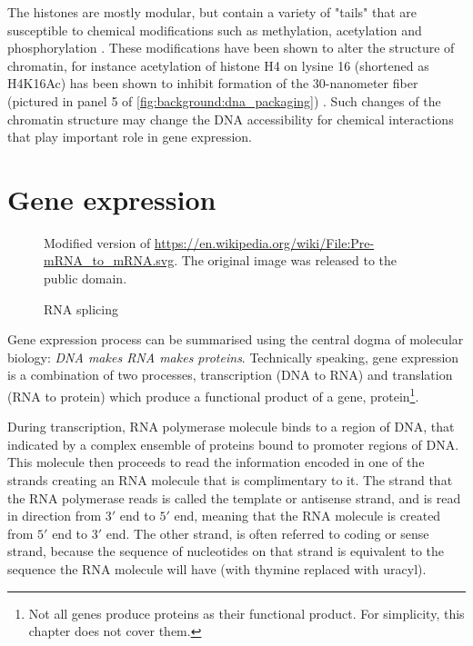 \documentclass[parskip]{cs4rep}
\newcommand{\histonemodification}[1]{#1}
\begin{document}
The histones are mostly modular, but contain a variety of "tails" that are susceptible to chemical modifications such as methylation, acetylation and phosphorylation \cite{Fischle:2003tl,Kouzarides:2007js}. These modifications have been shown to alter the structure of chromatin, for instance acetylation of histone H4 on lysine 16 (shortened as \histonemodification{H4K16Ac}) has been shown to inhibit formation of the 30-nanometer fiber (pictured in panel 5 of \autoref{fig:background:dna_packaging}) \cite{ShogrenKnaak:2006gt}. Such changes of the chromatin structure may change the DNA accessibility for chemical interactions that play important role in gene expression.

\section{Gene expression}
\begin{figure}[t]
\centering
{}
{\centering Modified version of \url{https://en.wikipedia.org/wiki/File:Pre-mRNA_to_mRNA.svg}. The original image was released to the public domain.}
\caption{RNA splicing}
\label{fig:background:splicing}
\end{figure}

Gene expression process can be summarised using the central dogma of molecular biology: 
\emph{DNA makes RNA makes proteins}. Technically speaking, gene expression is a combination of two processes, transcription (DNA to RNA) and
translation (RNA to protein) which produce a functional product of a gene, protein\footnote{Not all genes produce proteins as their functional product. For simplicity, this chapter does not cover them.}.

During transcription, RNA polymerase molecule binds to a region of DNA, that indicated by a complex ensemble of proteins bound to promoter regions of DNA. This molecule then proceeds to read the information encoded in one of the strands creating an RNA molecule that is complimentary to it. The strand that the RNA polymerase reads is called the template or antisense strand, and is read in direction from $3'$ end to $5'$ end, meaning that the RNA molecule is created from $5'$ end to $3'$ end. The other strand, is often referred to coding or sense strand, because the sequence of nucleotides on that strand is equivalent to the sequence the RNA molecule will have (with thymine replaced with uracyl). 
\end{document}
